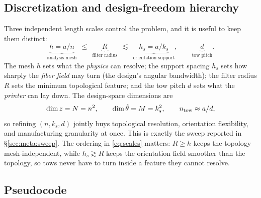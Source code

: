 \documentclass[11pt]{article}
\begin{document}
\subsection{Discretization and design-freedom hierarchy}
\label{sec:algo:res}
Three independent length scales control the problem, and it is useful to keep them
distinct:
\begin{equation}
  \underbrace{h=a/n}_{\text{analysis mesh}}\ \ \le\ \
  \underbrace{R}_{\text{filter radius}}\ \ \lesssim\ \
  \underbrace{h_s=a/k_s}_{\text{orientation support}},
  \qquad
  \underbrace{d}_{\text{tow pitch}} .
  \label{eq:scales}
\end{equation}
The mesh $h$ sets what the \emph{physics} can resolve; the support spacing $h_s$
sets how sharply the \emph{fiber field} may turn (the design's angular
bandwidth); the filter radius $R$ sets the minimum topological feature; and the
tow pitch $d$ sets what the \emph{printer} can lay down. The design-space
dimensions are
\begin{equation}
  \dim z=N=n^2,\qquad \dim\hat\theta=M=k_s^2,\qquad
  n_{\rm tow}\approx a/d ,
\end{equation}
so refining $(n,k_s,d)$ jointly buys topological resolution, orientation
flexibility, and manufacturing granularity at once. This is exactly the sweep
reported in \S\ref{sec:meta:sweep}. The ordering in \eqref{eq:scales} matters:
$R\ge h$ keeps the topology mesh-independent, while $h_s\gtrsim R$ keeps the
orientation field smoother than the topology, so tows never have to turn inside a
feature they cannot resolve.

\subsection{Pseudocode}
\label{sec:algo:pseudo}
\end{document}
